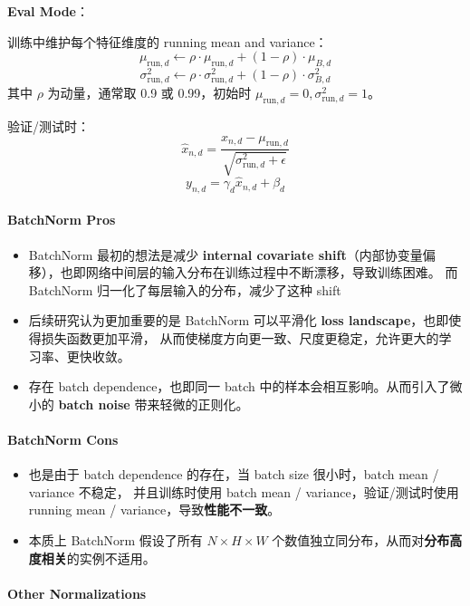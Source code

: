 \textbf{Eval Mode}：

训练中维护每个特征维度的 running mean and variance： \[
\mu_{\text{run}, d} \leftarrow \rho \cdot \mu_{\text{run}, d} + (1 - \rho) \cdot \mu_{B, d}
\] \[
\sigma^2_{\text{run}, d} \leftarrow \rho \cdot \sigma^2_{\text{run}, d} + (1 - \rho) \cdot \sigma^2_{B, d}
\] 其中 \(\rho\) 为动量，通常取 0.9 或 0.99，初始时
\(\mu_{\text{run}, d} = 0, \sigma^2_{\text{run}, d} = 1\)。

验证/测试时： \[
\hat x_{n,d} = \frac{x_{n,d} - \mu_{\text{run}, d}}{\sqrt{\sigma^2_{\text{run}, d} + \epsilon}}
\] \[
y_{n,d} = \gamma_d \hat x_{n,d} + \beta_d
\]

\paragraph{BatchNorm Pros}\label{batchnorm-pros}

\begin{itemize}
\tightlist
\item
  BatchNorm 最初的想法是减少 \textbf{internal covariate
  shift}（内部协变量偏移），也即网络中间层的输入分布在训练过程中不断漂移，导致训练困难。
  而 BatchNorm 归一化了每层输入的分布，减少了这种 shift
\item
  后续研究认为更加重要的是 BatchNorm 可以平滑化 \textbf{loss
  landscape}，也即使得损失函数更加平滑，
  从而使梯度方向更一致、尺度更稳定，允许更大的学习率、更快收敛。
\item
  存在 batch dependence，也即同一 batch
  中的样本会相互影响。从而引入了微小的 \textbf{batch noise}
  带来轻微的正则化。
\end{itemize}

\paragraph{BatchNorm Cons}\label{batchnorm-cons}

\begin{itemize}
\tightlist
\item
  也是由于 batch dependence 的存在，当 batch size 很小时，batch mean /
  variance 不稳定， 并且训练时使用 batch mean /
  variance，验证/测试时使用 running mean /
  variance，导致\textbf{性能不一致}。
\item
  本质上 BatchNorm 假设了所有 \(N \times H \times W\)
  个数值独立同分布，从而对\textbf{分布高度相关}的实例不适用。
\end{itemize}

\paragraph{Other Normalizations}\label{other-normalizations}

